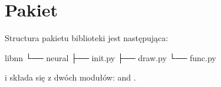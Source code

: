\documentclass[a4paper,12pt,polish]{jupyterBook}
\begin{document}
\section{Pakiet }
\label{\detokenize{docs/appendix:pakiet-neural}}\label{\detokenize{docs/appendix:app-lab}}
\sphinxAtStartPar
Structura pakietu biblioteki jest następująca:

\begin{sphinxVerbatim}[commandchars=\\\{\}]
lib\PYGZus{}nn
└── neural
    ├── \PYGZus{}\PYGZus{}init\PYGZus{}\PYGZus{}.py
    ├── draw.py
    └── func.py
\end{sphinxVerbatim}

\sphinxAtStartPar
i składa się z dwóch modułów:  and .
\end{document}
